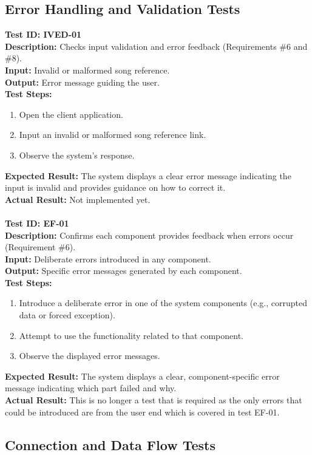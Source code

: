 \documentclass[12pt, titlepage]{article}
\begin{document}
\subsection{Error Handling and Validation Tests}
\textbf{Test ID: IVED-01}\\
\textbf{Description:} Checks input validation and error feedback (Requirements \#6 and \#8).\\
\textbf{Input:} Invalid or malformed song reference.\\
\textbf{Output:} Error message guiding the user.\\
\textbf{Test Steps:}
\begin{enumerate}
    \item Open the client application.
    \item Input an invalid or malformed song reference link.
    \item Observe the system's response.
\end{enumerate}
\textbf{Expected Result:} The system displays a clear error message indicating the input is invalid and provides guidance on how to correct it.\\
\textbf{Actual Result:} Not implemented yet.
\\ \\
\textbf{Test ID: EF-01}\\
\textbf{Description:} Confirms each component provides feedback when errors occur (Requirement \#6).\\
\textbf{Input:} Deliberate errors introduced in any component.\\
\textbf{Output:} Specific error messages generated by each component.\\
\textbf{Test Steps:}
\begin{enumerate}
    \item Introduce a deliberate error in one of the system components (e.g., corrupted data or forced exception).
    \item Attempt to use the functionality related to that component.
    \item Observe the displayed error messages.
\end{enumerate}
\textbf{Expected Result:} The system displays a clear, component-specific error message indicating which part failed and why.\\
\textbf{Actual Result:} This is no longer a test that is required as the only errors that could be introduced are from the user end which is covered in test EF-01.

\subsection{Connection and Data Flow Tests}
\end{document}
